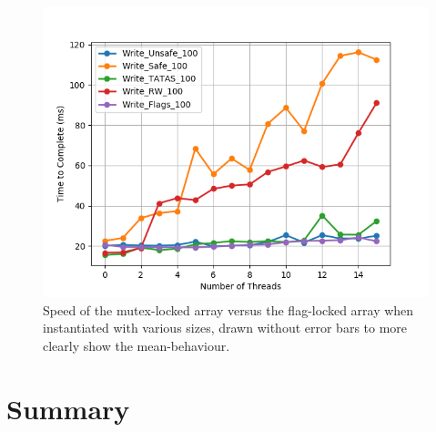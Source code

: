 \documentclass[11pt]{article}
\begin{document}
\begin{figure}\label{step7_4}
\centering
\includegraphics[scale=0.65]{step7_4.png}
\caption{Speed of the mutex-locked array versus the flag-locked array when instantiated with various sizes, drawn without error bars to more clearly show the mean-behaviour.}
\end{figure}




\section{Summary}
\end{document}
